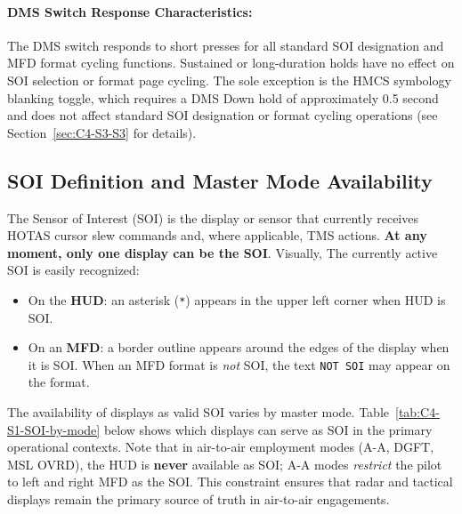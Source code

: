 \documentclass[11pt, a4paper, twoside]{report}
\begin{document}
\paragraph*{DMS Switch Response Characteristics:}

The DMS switch responds to short presses for all standard SOI designation and MFD format cycling functions. Sustained or long-duration holds have no effect on SOI selection or format page cycling. The sole exception is the HMCS symbology blanking toggle, which requires a DMS Down hold of approximately 0.5 second and does not affect standard SOI designation or format cycling operations (see Section~\ref{sec:C4-S3-S3} for details).

\subsection{SOI Definition and Master Mode Availability}
\label{sec:C4-S1-S1}

The Sensor of Interest (SOI) is the display or sensor that currently receives HOTAS cursor slew commands and, where applicable, TMS actions. \textbf{At any moment, only one display can be the SOI}. Visually, The currently active SOI is easily recognized:

\begin{itemize}
	\item On the \textbf{HUD}: an asterisk (\texttt{*}) appears in the upper left corner when HUD is SOI.
	\item On an \textbf{MFD}: a border outline appears around the edges of the display when it is SOI. When an MFD format is \textit{not} SOI, the text \texttt{NOT SOI} may appear on the format.
\end{itemize}

The availability of displays as valid SOI varies by master mode. Table~\ref{tab:C4-S1-SOI-by-mode} below shows which displays can serve as SOI in the primary operational contexts. Note that in air-to-air employment modes (A-A, DGFT, MSL OVRD), the HUD is \textbf{never} available as SOI; A-A modes \textit{restrict} the pilot to left and right MFD as the SOI. This constraint ensures that radar and tactical displays remain the primary source of truth in air-to-air engagements.

\small
\renewcommand{\arraystretch}{1.2}
\end{document}

